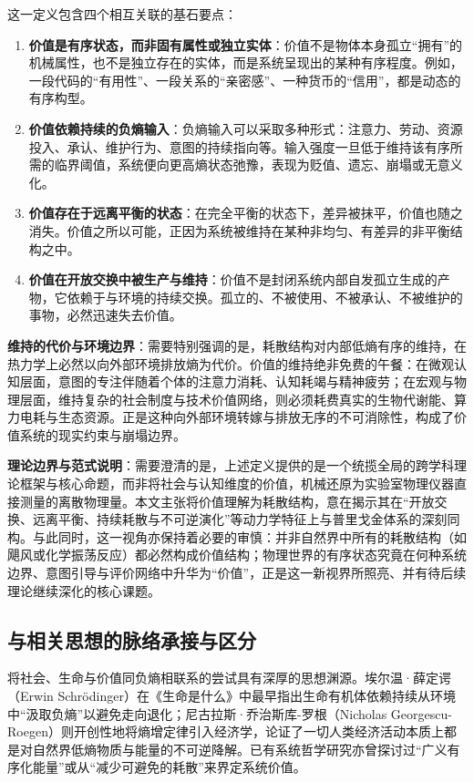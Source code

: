 \documentclass[11pt,a4paper]{ctexart}
\begin{document}
这一定义包含四个相互关联的基石要点：
\begin{enumerate}
    \item \textbf{价值是有序状态，而非固有属性或独立实体}：价值不是物体本身孤立“拥有”的机械属性，也不是独立存在的实体，而是系统呈现出的某种有序程度。例如，一段代码的“有用性”、一段关系的“亲密感”、一种货币的“信用”，都是动态的有序构型。
    \item \textbf{价值依赖持续的负熵输入}：负熵输入可以采取多种形式：注意力、劳动、资源投入、承认、维护行为、意图的持续指向等。输入强度一旦低于维持该有序所需的临界阈值，系统便向更高熵状态弛豫，表现为贬值、遗忘、崩塌或无意义化。
    \item \textbf{价值存在于远离平衡的状态}：在完全平衡的状态下，差异被抹平，价值也随之消失。价值之所以可能，正因为系统被维持在某种非均匀、有差异的非平衡结构之中。
    \item \textbf{价值在开放交换中被生产与维持}：价值不是封闭系统内部自发孤立生成的产物，它依赖于与环境的持续交换。孤立的、不被使用、不被承认、不被维护的事物，必然迅速失去价值。
\end{enumerate}

\textbf{维持的代价与环境边界}：需要特别强调的是，耗散结构对内部低熵有序的维持，在热力学上必然以向外部环境排放熵为代价。价值的维持绝非免费的午餐：在微观认知层面，意图的专注伴随着个体的注意力消耗、认知耗竭与精神疲劳；在宏观与物理层面，维持复杂的社会制度与技术价值网络，则必须耗费真实的生物代谢能、算力电耗与生态资源。正是这种向外部环境转嫁与排放无序的不可消除性，构成了价值系统的现实约束与崩塌边界。

\textbf{理论边界与范式说明}：需要澄清的是，上述定义提供的是一个统揽全局的跨学科理论框架与核心命题，而非将社会与认知维度的价值，机械还原为实验室物理仪器直接测量的离散物理量。本文主张将价值理解为耗散结构，意在揭示其在“开放交换、远离平衡、持续耗散与不可逆演化”等动力学特征上与普里戈金体系的深刻同构。与此同时，这一视角亦保持着必要的审慎：并非自然界中所有的耗散结构（如飓风或化学振荡反应）都必然构成价值结构；物理世界的有序状态究竟在何种系统边界、意图引导与评价网络中升华为“价值”，正是这一新视界所照亮、并有待后续理论继续深化的核心课题。

\subsection{与相关思想的脉络承接与区分}
将社会、生命与价值同负熵相联系的尝试具有深厚的思想渊源。埃尔温·薛定谔（Erwin Schrödinger）在《生命是什么》中最早指出生命有机体依赖持续从环境中“汲取负熵”以避免走向退化\cite{schrodinger1944what}；尼古拉斯·乔治斯库-罗根（Nicholas Georgescu-Roegen）则开创性地将熵增定律引入经济学，论证了一切人类经济活动本质上都是对自然界低熵物质与能量的不可逆降解\cite{georgescu1971entropy}。已有系统哲学研究亦曾探讨过“广义有序化能量”或从“减少可避免的耗散”来界定系统价值。
\end{document}
